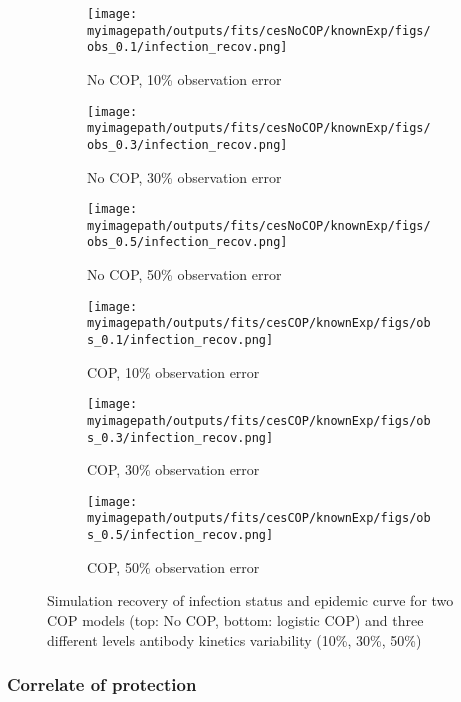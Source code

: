 \documentclass{article}
\newcommand{\myimagepath}{/Users/davidhodgson/Dropbox/Mac (3)/Documents/research/Rpackages/rjmc/}
\begin{document}
\begin{figure}[H]
    \centering
    \begin{subfigure}{0.31\textwidth}
        \centering
        \texttt{[image: \\myimagepath/outputs/fits/cesNoCOP/knownExp/figs/obs\_0.1/infection\_recov.png]}
        \caption{No COP, 10\% observation error \label{fit1:inf}}
    \end{subfigure}
    \begin{subfigure}{0.31\textwidth}
        \centering
        \texttt{[image: \\myimagepath/outputs/fits/cesNoCOP/knownExp/figs/obs\_0.3/infection\_recov.png]}
        \caption{No COP, 30\% observation error}
    \end{subfigure}
    \begin{subfigure}{0.31\textwidth}
        \centering
        \texttt{[image: \\myimagepath/outputs/fits/cesNoCOP/knownExp/figs/obs\_0.5/infection\_recov.png]}
        \caption{No COP, 50\% observation error}
    \end{subfigure}
    
  \begin{subfigure}{0.31\textwidth}
        \centering
        \texttt{[image: \\myimagepath/outputs/fits/cesCOP/knownExp/figs/obs\_0.1/infection\_recov.png]}
        \caption{ COP, 10\% observation error}
    \end{subfigure}
    \begin{subfigure}{0.31\textwidth}
        \centering
        \texttt{[image: \\myimagepath/outputs/fits/cesCOP/knownExp/figs/obs\_0.3/infection\_recov.png]}
        \caption{ COP, 30\% observation error}
    \end{subfigure}
    \begin{subfigure}{0.31\textwidth}
        \centering
        \texttt{[image: \\myimagepath/outputs/fits/cesCOP/knownExp/figs/obs\_0.5/infection\_recov.png]}
        \caption{ COP, 50\% observation error}
    \end{subfigure}
    
    \caption{Simulation recovery of infection status and epidemic curve for two COP models (top: No COP, bottom: logistic COP) and three different levels antibody kinetics variability (10\%, 30\%, 50\%)}
\end{figure}


\subsubsection{Correlate of protection}
\end{document}
